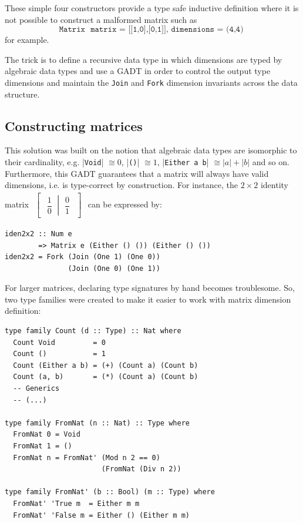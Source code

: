 \documentclass[sigplan]{acmart}\settopmatter{}
\newcommand{\hs}{\texttt}
\begin{document}
These simple four constructors provide a type safe inductive definition where it is not possible to construct a malformed matrix such as \[\hs{Matrix { matrix = [[1,0],[0,1]], dimensions = (4,4) }}\] for example.

The trick is to define a recursive data type in which dimensions are typed by algebraic data types and use a GADT in order to control the output type dimensions and maintain the \hs{Join} and \hs{Fork} dimension invariants across the data structure.

\subsection{Constructing matrices}

This solution was built on the notion that algebraic data types are isomorphic to their cardinality, e.g. |\hs{Void}| $ \cong 0$, |\hs{()}| $\cong 1$, |\hs{Either a b}| $\cong |a| + |b|$ and so on. Furthermore, this GADT guarantees that a matrix will always have valid dimensions, i.e. is type-correct by construction. For instance, the $2 \times 2$ identity matrix
%
$\begin{aligned}
\begin{bmatrix}
\left.\begin{matrix}
\dfrac{1}{0}
\end{matrix}\ \right|\ \begin{matrix}
\dfrac{0}{1}
\end{matrix}
\end{bmatrix}
\end{aligned}{}$ can be expressed by:
\vspace{1mm}
\begin{verbatim}
iden2x2 :: Num e 
        => Matrix e (Either () ()) (Either () ())
iden2x2 = Fork (Join (One 1) (One 0)) 
               (Join (One 0) (One 1))
\end{verbatim}
\vspace{1mm}

For larger matrices, declaring type signatures by hand becomes troublesome. So, two type families were created to make it easier to work with matrix dimension definition:

\vspace{1mm}
\begin{verbatim}
type family Count (d :: Type) :: Nat where
  Count Void         = 0
  Count ()           = 1
  Count (Either a b) = (+) (Count a) (Count b)
  Count (a, b)       = (*) (Count a) (Count b)
  -- Generics
  -- (...)
  
type family FromNat (n :: Nat) :: Type where
  FromNat 0 = Void
  FromNat 1 = ()
  FromNat n = FromNat' (Mod n 2 == 0) 
                       (FromNat (Div n 2))

type family FromNat' (b :: Bool) (m :: Type) where
  FromNat' 'True m  = Either m m
  FromNat' 'False m = Either () (Either m m)
\end{verbatim}
\vspace{1mm}
\end{document}
